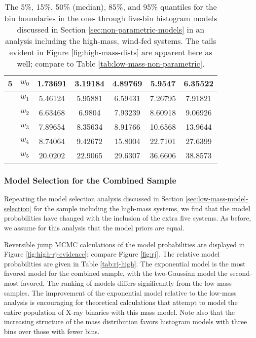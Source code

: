 \documentclass[preprint]{aastex}
\begin{document}
\begin{table}
\begin{center}
\begin{tabular}{|c|c|c|c|c|c|c|}
      \hline \hline
      5 & $w_0$ & 1.73691 & 3.19184 & 4.89769 & 5.9547 & 6.35522 \\
      \hline
      & $w_1$ & 5.46124 & 5.95881 & 6.59431 & 7.26795 & 7.91821 \\
      \hline
      & $w_2$ & 6.63468 & 6.9804 & 7.93239 & 8.60918 & 9.06926 \\
      \hline
      & $w_3$ & 7.89654 & 8.35634 & 8.91766 & 10.6568 & 13.9644 \\
      \hline
      & $w_4$ & 8.74064 & 9.42672 & 15.8004 & 22.7101 & 27.6399 \\
      \hline
      & $w_5$ & 20.0202 & 22.9065 & 29.6307 & 36.6606 & 38.8573 \\
      \hline
    \end{tabular}
  \end{center}
  \caption{\label{tab:high-mass-non-parametric} The 5\%, 15\%, 50\%
    (median), 85\%, and 95\% quantiles for the bin boundaries in the
    one- through five-bin histogram models discussed in Section
    \ref{sec:non-parametric-models} in an 
    analysis including the high-mass, wind-fed systems.  
    The tails evident in Figure \ref{fig:high-mass-dists} are apparent
    here as well; compare to Table \ref{tab:low-mass-non-parametric}.}
\end{table}

\subsubsection{Model Selection for the Combined Sample}
\label{sec:high-mass-model-selection}

Repeating the model selection analysis discussed in Section
\ref{sec:low-mass-model-selection} for the sample including the
high-mass systems, we find that the model probabilities have changed
with the inclusion of the extra five systems.  As before, we assume
for this analysis that the model priors are equal.

Reversible jump MCMC calculations of the model probabilities are
displayed in Figure \ref{fig:high-rj-evidence}; compare Figure
\ref{fig:rj}.  The relative model probabilities are given in Table
\ref{tab:rj-high}.  The exponential model is the most favored model
for the combined sample, with the two-Gaussian model the second-most
favored.  The ranking of models differs significantly from the
low-mass samples.  The improvement of the exponential model relative
to the low-mass analysis is encouraging for theoretical calculations
that attempt to model the entire population of X-ray binaries with
this mass model.  Note also that the increasing structure of the mass
distribution favors histogram models with three bins over those with
fewer bins.
\end{document}
